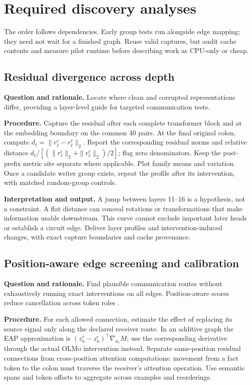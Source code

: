 \documentclass[11pt,a4paper]{article}
\newcommand{\purpose}{\textbf{Question and rationale.} }
\newcommand{\procedure}{\textbf{Procedure.} }
\newcommand{\interpretation}{\textbf{Interpretation and output.} }
\begin{document}
\section{Required discovery analyses}
The order follows dependencies. Early group tests run alongside edge mapping;
they need not wait for a finished graph. Reuse valid captures, but audit cache
contents and measure pilot runtime before describing work as CPU-only or cheap.

\subsection{Residual divergence across depth}
\purpose Locate where clean and corrupted representations differ, providing
a layer-level guide for targeted communication tests.

\procedure Capture the residual after each complete transformer block and at
the embedding boundary on the common 40 pairs. At the final original colon,
compute $d_\ell=\|r^c_\ell-r^r_\ell\|_2$. Report the corresponding residual
norms and relative distance
$d_\ell/[(\|r^c_\ell\|_2+\|r^r_\ell\|_2)/2]$; flag zero denominators.
Keep the post-prefix metric site separate where applicable. Plot family means
and variation. Once a candidate writer group exists, repeat the profile after
its intervention, with matched random-group controls.

\interpretation A jump between layers 11--16 is a hypothesis, not a constraint.
A flat distance can conceal rotations or transformations that make information
usable downstream. This curve cannot exclude important later heads or establish
a circuit edge. Deliver layer profiles and intervention-induced changes, with
exact capture boundaries and cache provenance.

\subsection{Position-aware edge screening and calibration}
\purpose Find plausible communication routes without exhaustively running
exact interventions on all edges. Position-aware scores reduce cancellation
across token roles \cite{eap,peap}.

\procedure For each allowed connection, estimate the effect of replacing its
source signal only along the declared receiver route. In an additive graph the
EAP approximation is $(z_u^r-z_u^c)^\top\nabla_{a_v}M$; use the corresponding
derivative through the actual OLMo intervention instead. Separate same-position
residual connections from cross-position attention computations: movement from
a fact token to the colon must traverse the receiver's attention operation.
Use semantic spans and token offsets to aggregate across examples and reorderings.
\end{document}

